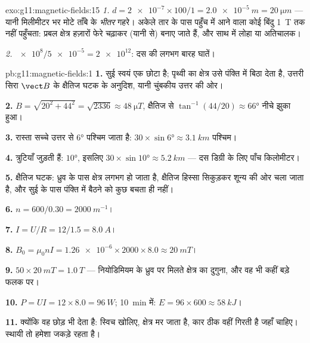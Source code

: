 \begin{solution}{exo:g11:magnetic-fields:15}
\emph{1.} $d = \num{2e-7} \times 100 / 1 = \qty{2.0e-5}{m} =
\qty{20}{\micro m}$ --- यानी मिलीमीटर भर मोटे ताँबे के \emph{भीतर} गहरे। अकेले
तार के पास पहुँच में आने वाला कोई बिंदु \qty{1}{T} तक नहीं पहुँचता: प्रबल
क्षेत्र हज़ारों फेरे चढ़ाकर (यानी  से) बनाए जाते
हैं, और साथ में लोहा या अतिचालक।

\emph{2.} $\num{e8} / \num{5e-5} = \num{2e12}$: दस की लगभग बारह घातें।
\end{solution}

\begin{solution}{pb:g11:magnetic-fields:1}
\textbf{1.} सुई स्वयं एक छोटा  है; पृथ्वी का क्षेत्र उसे
पंक्ति में बिठा देता है, उत्तरी सिरा $\vect B$ के क्षैतिज घटक के अनुदिश, यानी
चुंबकीय उत्तर की ओर।

\textbf{2.} $B = \sqrt{20^2 + 44^2} = \sqrt{2336} \approx
\qty{48}{\micro T}$, क्षैतिज से $\tan^{-1}(44/20) \approx \ang{66}$ नीचे झुका हुआ।

\textbf{3.} रास्ता सच्चे उत्तर से $\ang{6}$ पश्चिम जाता है: $30 \times \sin\ang{6} \approx \qty{3.1}{km}$ पश्चिम।

\textbf{4.} त्रुटियाँ जुड़ती हैं: $\ang{10}$, इसलिए $30 \times \sin\ang{10} \approx
\qty{5.2}{km}$ --- दस डिग्री के लिए
पाँच किलोमीटर।

\textbf{5.} क्षैतिज घटक: ध्रुव के पास क्षेत्र लगभग  हो जाता
है, क्षैतिज हिस्सा सिकुड़कर शून्य की ओर चला जाता है, और सुई के पास पंक्ति
में बैठने को कुछ बचता ही नहीं।

\textbf{6.} $n = 600/0.30 = \qty{2000}{m^{-1}}$।

\textbf{7.} $I = U/R = 12/1.5 = \qty{8.0}{A}$।

\textbf{8.} $B_0 = \mu_0 n I = \num{1.26e-6} \times 2000 \times 8.0
\approx \qty{20}{mT}$।

\textbf{9.} $50 \times \qty{20}{mT} = \qty{1.0}{T}$ --- नियोडिमियम के ध्रुव पर मिलते क्षेत्र का
दुगुना, और वह भी कहीं बड़े फलक पर।

\textbf{10.} $P = UI = 12 \times 8.0 = \qty{96}{W}$; \qty{10}{\minute} में: $E = 96 \times 600 \approx \qty{58}{kJ}$।

\textbf{11.} क्योंकि वह छोड़ भी देता है: स्विच खोलिए, क्षेत्र मर जाता
है, कार ठीक वहीं गिरती है जहाँ चाहिए। स्थायी  तो हमेशा जकड़े
रहता है।


\end{solution}

